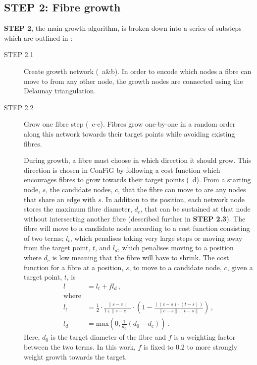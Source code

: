 \subsection{STEP 2: Fibre growth}
\label{sec:ipmi_step2_growth}
\textbf{\sffamily STEP 2}, the main growth algorithm, is broken down into a series of substeps which are outlined in :
\begin{description}
  \item [STEP 2.1] Create growth network (~a\&b). In order to encode which nodes a fibre can move to from any other node, the growth nodes are connected using the Delaunay triangulation.

  \item [STEP 2.2] Grow one fibre step (~c-e). Fibres grow one-by-one in a random order along this network towards their target points while avoiding existing fibres.

    During growth, a fibre must choose in which direction it should grow. This direction is chosen in ConFiG by following a cost function which encourages fibres to grow towards their target points (~d).
From a starting node, $s$, the candidate nodes, $c$, that the fibre can move to are any nodes that share an edge with $s$. In addition to its position, each network node stores the maximum fibre diameter, $d_c$, that can be sustained at that node without intersecting another fibre (described further in \textbf{\sffamily STEP 2.3}). The fibre will move to a candidate node according to a cost function consisting of two terms; $l_t$, which penalises taking very large steps or moving away from the target point, $t$, and $l_d$, which penalises moving to a position where $d_c$ is low meaning that the fibre will have to shrink. The cost function for a fibre at a position, $s$, to move to a candidate node, $c$, given a target point, $t$, is
\begin{align}
  l &= l_t+fl_d  \,,\label{eq:ipmi_original_cost}\\
      \mathrm{where}\nonumber\\
  l_t &=  \frac{1}{2} \cdot \frac{\|s-c\|}{1+ \|s-c\|} \cdot \left(1- \frac{\left(\left(c-s\right) \cdot \left(t-s\right)\right)}{\|c-s\|\|t-s\|}\right)\,, \label{eq:ipmi_original_lt}\\
  l_d &=\mathrm{max}\left(0, \frac{1}{d_0} \left(d_0 - d_c \right)\right) \,. \label{eq:ipmi_original_ld}
\end{align}
Here, $d_0$ is the target diameter of the fibre and $f$ is a weighting factor between the two terms. In this work, $f$ is fixed to 0.2 to more strongly weight growth towards the target.


\end{description}
